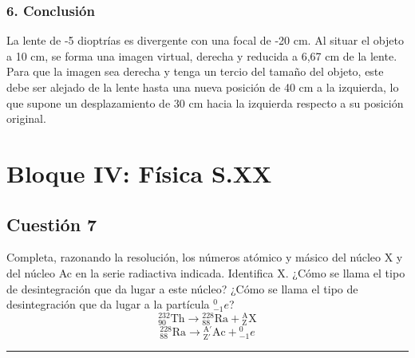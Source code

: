 \subsubsection*{6. Conclusión}
\begin{cajaconclusion}
La lente de -5 dioptrías es divergente con una focal de -20 cm. Al situar el objeto a 10 cm, se forma una imagen virtual, derecha y reducida a 6,67 cm de la lente. Para que la imagen sea derecha y tenga un tercio del tamaño del objeto, este debe ser alejado de la lente hasta una nueva posición de 40 cm a la izquierda, lo que supone un desplazamiento de 30 cm hacia la izquierda respecto a su posición original.
\end{cajaconclusion}

\newpage
\section{Bloque IV: Física S.XX}
\label{sec:grav_2020_sep_ext}

\newpage
\subsection{Cuestión 7}
\label{subsec:C7_2021_jun_ord}

\begin{cajaenunciado}
Completa, razonando la resolución, los números atómico y másico del núcleo X y del núcleo Ac en la serie radiactiva indicada. Identifica X. ¿Cómo se llama el tipo de desintegración que da lugar a este núcleo? ¿Cómo se llama el tipo de desintegración que da lugar a la partícula $_{-1}^{0}e$?
$$ {}_{90}^{232}\text{Th} \rightarrow {}_{88}^{228}\text{Ra} + {}_{\text{Z}}^{\text{A}}\text{X} $$
$$ {}_{88}^{228}\text{Ra} \rightarrow {}_{\text{Z}'}^{\text{A}'}\text{Ac} + {}_{-1}^{0}e $$
\end{cajaenunciado}
\hrule

